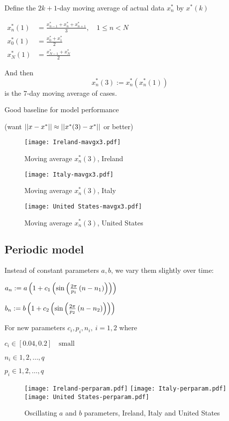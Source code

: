Define the $2k+1$-day moving average of actual data $x_n^*$ by $x^*(k)$

$\begin{aligned}
x^*_n(1) &=\frac{x^*_{n-1} + x^*_n + x^*_{n+1}}{3},\quad 1\leq n < N \\
x^*_0(1) &=\frac{x^*_0 + x^*_1}{2}\\
x^*_N(1) &=\frac{x^*_{N-1} + x^*_N}{2}
\end{aligned}$

And then $$x_n^*(3):= x^*_n(x^*_n(1))$$ is the 7-day moving average of cases.

Good baseline for model performance 

(want $\left|\left|x-x^*\right|\right|\approx\left|\left|x^*(3)-x^*\right|\right|$ or better)

\begin{figure}[H]
\texttt{[image: Ireland-mavgx3.pdf]}
\endminipage 
\caption{Moving average $x^*_n (3)$, Ireland}
\end{figure}

\begin{figure}[H]
\texttt{[image: Italy-mavgx3.pdf]}
\endminipage 
\caption{Moving average $x^*_n (3)$, Italy}
\end{figure}

\begin{figure}[H]
\texttt{[image: United States-mavgx3.pdf]}
\endminipage 
\caption{Moving average $x^*_n (3)$, United States}
\end{figure}

\subsection{Periodic model}

Instead of constant parameters $a,b$, we vary them slightly over time:

$a_n := a\left(1+c_1\left(\sin\left(\frac{2\pi}{p_1}\left(n-n_1\right)\right)\right)\right)$

$b_n := b\left(1+c_2\left(\sin\left(\frac{2\pi}{p_2}\left(n-n_2\right)\right)\right)\right)$

For new parameters $c_i,p_i,n_i, \ i=1,2$ where

$c_i  \in [0.04, 0.2] \quad \text{small}$

$n_i  \in 1,2,\dots,q$

$p_i  \in 1,2,\dots,q$

\begin{figure}[H]
  \texttt{[image: Ireland-perparam.pdf]} \label{fig:ireland-perparam}
\endminipage\hfill
{}
  \texttt{[image: Italy-perparam.pdf]} \label{fig:italy-perparam}
\endminipage\hfill
{}
  \texttt{[image: United States-perparam.pdf]} \label{fig:usa-perparam}
\endminipage\hfill
\caption{Oscillating $a$ and $b$ parameters, Ireland, Italy and United States}
\end{figure}

